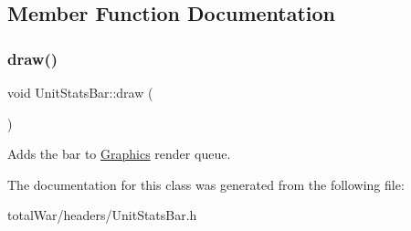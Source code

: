 \subsection{Member Function Documentation}
\mbox{\label{class_unit_stats_bar_a45e9422bfefe76358391e5abc5e848e7}} 
\subsubsection{\texorpdfstring{draw()}{draw()}}
{\footnotesize\ttfamily void Unit\+Stats\+Bar\+::draw (\begin{DoxyParamCaption}{ }\end{DoxyParamCaption})}

Adds the bar to \hyperlink{class_graphics}{Graphics} render queue. 

The documentation for this class was generated from the following file\+:\begin{DoxyCompactItemize}
\item 
total\+War/headers/Unit\+Stats\+Bar.\+h\end{DoxyCompactItemize}
